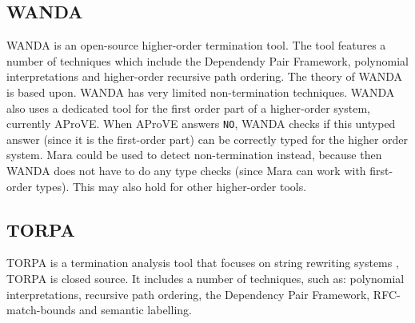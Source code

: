 \subsection*{WANDA}
WANDA is an open-source higher-order termination tool\cite{KOP:WANDASITE}. The tool features a number of techniques which include the Dependendy Pair Framework, polynomial interpretations and higher-order recursive path ordering. The theory of WANDA is based upon\cite{KOP:WANDA}. WANDA has very limited non-termination techniques. WANDA also uses a dedicated tool for the first order part of a higher-order system, currently AProVE. When AProVE answers \texttt{NO}, WANDA checks if this untyped answer (since it is the first-order part) can be correctly typed for the higher order system. Mara could be used to detect non-termination instead, because then WANDA does not have to do any type checks (since Mara can work with first-order types). This may also hold for other higher-order tools.

\subsection*{TORPA}
TORPA is a termination analysis tool that focuses on string rewriting systems \cite{ZANTEMA:TORPA}, TORPA is closed source. It includes a number of techniques, such as: polynomial interpretations, recursive path ordering, the Dependency Pair Framework, RFC-match-bounds and semantic labelling. 